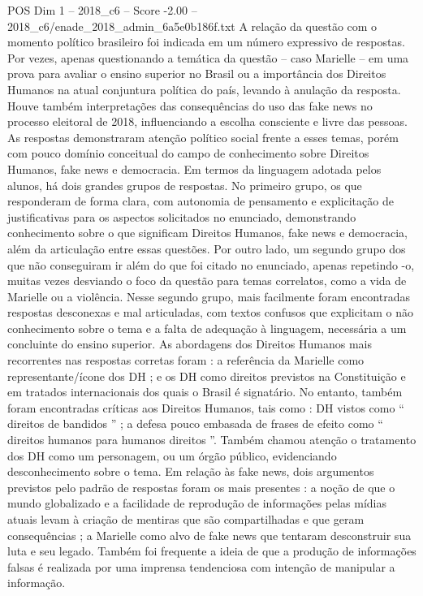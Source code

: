 \begin{textsample}{POS Dim 1 – 2018\_c6 – Score -2.00 – 2018\_c6/enade\_2018\_admin\_6a5e0b186f.txt}
A relação da questão com o momento político brasileiro foi indicada em um número expressivo de respostas.
Por vezes, apenas questionando a temática da questão – caso Marielle – em uma prova para avaliar o ensino superior no Brasil ou a importância dos Direitos Humanos na atual conjuntura política do país, levando à anulação da resposta.
Houve também interpretações das consequências do uso das fake news no processo eleitoral de 2018, influenciando a escolha consciente e livre das pessoas.
As respostas demonstraram atenção político social frente a esses temas, porém com pouco domínio conceitual do campo de conhecimento sobre Direitos Humanos, fake news e democracia.
Em termos da linguagem adotada pelos alunos, há dois grandes grupos de respostas.
No primeiro grupo, os que responderam de forma clara, com autonomia de pensamento e explicitação de justificativas para os aspectos solicitados no enunciado, demonstrando conhecimento sobre o que significam Direitos Humanos, fake news e democracia, além da articulação entre essas questões.
Por outro lado, um segundo grupo dos que não conseguiram ir além do que foi citado no enunciado, apenas repetindo -o, muitas vezes desviando o foco da questão para temas correlatos, como a vida de Marielle ou a violência.
Nesse segundo grupo, mais facilmente foram encontradas respostas desconexas e mal articuladas, com textos confusos que explicitam o não conhecimento sobre o tema e a falta de adequação à linguagem, necessária a um concluinte do ensino superior.
As abordagens dos Direitos Humanos mais recorrentes nas respostas corretas foram : a referência da Marielle como representante/ícone dos DH ; e os DH como direitos previstos na Constituição e em tratados internacionais dos quais o Brasil é signatário.
No entanto, também foram encontradas críticas aos Direitos Humanos, tais como : DH vistos como “ direitos de bandidos ” ; a defesa pouco embasada de frases de efeito como “ direitos humanos para humanos direitos ”.
Também chamou atenção o tratamento dos DH como um personagem, ou um órgão público, evidenciando desconhecimento sobre o tema.
Em relação às fake news, dois argumentos previstos pelo padrão de respostas foram os mais presentes : a noção de que o mundo globalizado e a facilidade de reprodução de informações pelas mídias atuais levam à criação de mentiras que são compartilhadas e que geram consequências ; a Marielle como alvo de fake news que tentaram desconstruir sua luta e seu legado.
Também foi frequente a ideia de que a produção de informações falsas é realizada por uma imprensa tendenciosa com intenção de manipular a informação.

\end{textsample}
